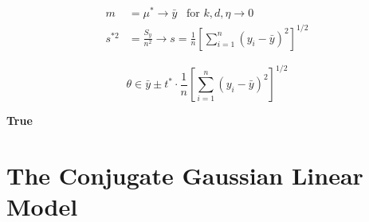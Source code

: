 \documentclass[10pt]{article}
\begin{document}
\begin{enumerate}[label=(\Alph*)]
        \begin{align*}
          m &= \mu^* \rightarrow \bar{y} \hspace{10pt} \text{for $k, d, \eta \to 0$} \\
          s^{*2} &= \frac{S_y}{n^2} \rightarrow s = \frac{1}{n} \left[\sum_{i=1}^n(y_i - \bar{y})^2 \right]^{1/2}
        \end{align*}

        $$\theta \in \bar{y} \pm t^* \cdot \frac{1}{n} \left[\sum_{i=1}^n(y_i - \bar{y})^2 \right]^{1/2}$$

        \textbf{True}
    \end{enumerate}

    \clearpage

    \section*{The Conjugate Gaussian Linear Model}
\end{document}
